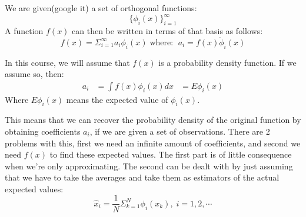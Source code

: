 {
    We are given(google it) a set of orthogonal functions:
    \begin{equation}
        \{\phi_i(x)\}^{\infty}_{i=1}
    \end{equation}
    A function $f(x)$ can then be written in terms of that basis as follows:
     \begin{equation}
         f(x) = \Sigma_{i=1}^{\infty} a_i\phi_i(x)\;\text{where: }\; a_i = f(x) \dot\phi_i(x)
    \end{equation}

    In this course, we will assume that $f(x)$ is a probability density function. If we assume so, then:
    \begin{equation}
        \begin{aligned}
            a_i &= \int f(x)\phi_i(x)dx &= E\phi_i(x)
        \end{aligned}
    \end{equation}
    Where $E\phi_i(x)$ means the expected value of $\phi_i(x)$.
}

This means that we can recover the probability density of the original function by obtaining coefficients $a_i$, if we are given a set of observations. There are 2 problems with this, first we need an infinite amount of coefficients,
and second we need  $f(x)$ to find these expected values.
The first part is of little consequence when we're only approximating. 
The second can be dealt with by just assuming that we have to take the averages and take them as estimators of the actual expected values:
\begin{equation}
    \hat{x}_i = \frac{1}{N}\Sigma_{k=1}^{N}\phi_i(x_k),\; i = 1,2,\cdots 
\end{equation}

